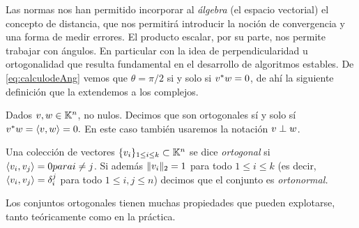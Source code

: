 \tcc
Las normas nos han permitido incorporar al \emph{álgebra} (el espacio vectorial) el concepto de distancia, que  nos permitirá introducir la noción de convergencia y una forma de medir errores.  El producto escalar, por su parte, nos permite trabajar con ángulos. En particular con la idea de perpendicularidad u ortogonalidad que resulta  fundamental en el desarrollo de algoritmos estables.
\etcc
De \eqref{eq:calculodeAng} vemos que $\theta=\pi/2$ si y solo si $\vb^*\wb=0$, de ahí la siguiente definición que la extendemos a los complejos.
\tccdefi
\begin{definicion}
 Dados $\vb,\wb\in\K^n$, no nulos. Decimos que son ortogonales sí y solo sí  $\vb^*\wb=\langle \vb,\wb\rangle=0.$ En este caso también usaremos la notación $\vb\perp \wb$.
\end{definicion}
\etcc
\tccdefi
\begin{definicion}
 Una colección de vectores  $\{\vb_i\}_{1\le i\le k}\subset \K^{n}$ se dice \emph{ortogonal} si $\langle \vb_i,\vb_j\rangle = 0 para i \neq j$. Si además $\|\vb_i\|_2=1$ para todo $1\le i\le k$ (es decir, $\langle \vb_i,\vb_j\rangle = \delta_i^j$ para todo $1 \le i, j \le n$) decimos que el conjunto es \emph{ortonormal.}
\end{definicion}
\etcc
Los conjuntos ortogonales tienen muchas propiedades que pueden explotarse, tanto teóricamente como en la práctica.

